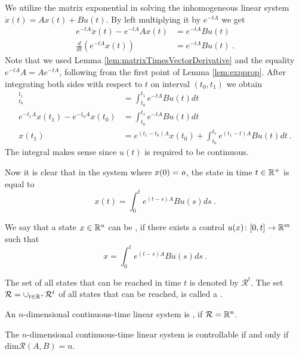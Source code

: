We utilize the matrix exponential in solving the inhomogeneous linear system $\dot{x}(t)=Ax(t)+Bu(t)$. By left multiplying it by $e^{-tA}$ we get
\begin{align*}
	e^{-tA}\dot{x}(t)-e^{-tA}Ax(t) &=e^{-tA}Bu(t) \\
	\frac{d}{dt} (e^{-tA}x(t)) &=e^{-tA}Bu(t)\ .
\end{align*}
Note that we used Lemma \ref{lem:matrixTimesVectorDerivative} and the equality $e^{-tA}A=Ae^{-tA}$, following from the first point of Lemma \ref{lem:expprop}. After integrating both sides with respect to $t$ on interval $(t_0,t_1)$ we obtain
\begin{align*}
	[e^{-tA}x(t)]^{t_1}_{t_0}&=\int^{t_1}_{t_0}e^{-tA}Bu(t)dt \\
	e^{-t_1A}x(t_1)-e^{-t_0A}x(t_0)&=\int^{t_1}_{t_0}e^{-tA}Bu(t)dt \\
	x(t_1)&=e^{(t_1-t_0)A}x(t_0)+\int^{t_1}_{t_0}e^{(t_1-t)A}Bu(t)dt\ .
\end{align*}
The integral makes sense since $u(t)$ is required to be continuous.

Now it is clear that in the system where $x(0)=\textit{o}$, the state in time $t\in \mathbb{R}^+$ is equal to
\begin{equation}
\label{eq:coolVzorec}
	x(t)=\int^t_0 e^{(t-s)A}Bu(s)ds\ .
\end{equation}

\begin{definition}
	We say that a state $x\in\mathbb{R}^n$ can be , if there exists a control $u(x)\colon[0,t]\rightarrow\mathbb{R}^m$ such that
	$$x=\int^t_0 e^{(t-s)A}Bu(s)ds\ .$$

	The set of all states that can be reached in time $t$ is denoted by $\mathcal{R}^t$. The set $\mathcal{R}=\cup_{t\in\mathbb{R}^+}\mathcal{R}^t$ of all states that can be reached, is called a .
\end{definition}

\begin{definition}
	An $n$-dimensional continuous-time linear system is , if $\mathcal{R}=\mathbb{R}^n$.
\end{definition}

\begin{theorem}
\label{theorem:controllabilityContinuous}
	The $n$-dimensional continuous-time linear system is controllable if and only if $\text{dim}\mathcal{R}(A,B)=n$.
\end{theorem}

